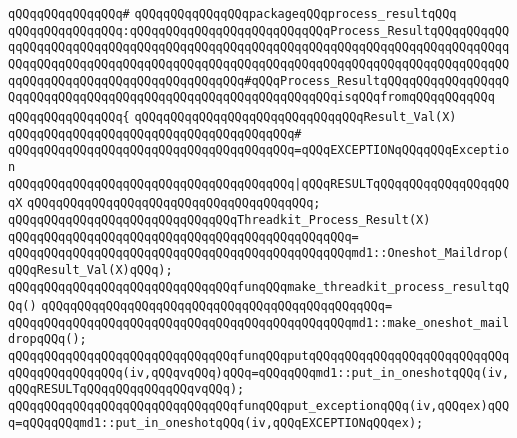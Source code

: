 \verb|qQQqqQQqqQQqqQQq#|\newline
\verb|qQQqqQQqqQQqqQQqpackageqQQqprocess_resultqQQq|\newline
\verb|qQQqqQQqqQQqqQQq:qQQqqQQqqQQqqQQqqQQqqQQqqQQqProcess_ResultqQQqqQQqqQQqqQQqqQQqqQQqqQQqqQQqqQQqqQQqqQQqqQQqqQQqqQQqqQQqqQQqqQQqqQQqqQQqqQQqqQQqqQQqqQQqqQQqqQQqqQQqqQQqqQQqqQQqqQQqqQQqqQQqqQQqqQQqqQQqqQQqqQQqqQQqqQQqqQQqqQQqqQQqqQQqqQQqqQQqqQQq#qQQqProcess_ResultqQQqqQQqqQQqqQQqqQQqqQQqqQQqqQQqqQQqqQQqqQQqqQQqqQQqqQQqqQQqqQQqisqQQqfromqQQqqQQqqQQq|\newline
\verb|qQQqqQQqqQQqqQQq{|\newline
\verb|qQQqqQQqqQQqqQQqqQQqqQQqqQQqqQQqResult_Val(X)|\newline
\verb|qQQqqQQqqQQqqQQqqQQqqQQqqQQqqQQqqQQqqQQq#|\newline
\verb|qQQqqQQqqQQqqQQqqQQqqQQqqQQqqQQqqQQqqQQq=qQQqEXCEPTIONqQQqqQQqException|\newline
\verb|qQQqqQQqqQQqqQQqqQQqqQQqqQQqqQQqqQQqqQQq|\verb#|qQQqRESULTqQQqqQQqqQQqqQQqqQQqX#\newline
\verb|qQQqqQQqqQQqqQQqqQQqqQQqqQQqqQQqqQQqqQQq;|\newline
\newline
\verb|qQQqqQQqqQQqqQQqqQQqqQQqqQQqqQQqThreadkit_Process_Result(X)|\newline
\verb|qQQqqQQqqQQqqQQqqQQqqQQqqQQqqQQqqQQqqQQqqQQqqQQq=|\newline
\verb|qQQqqQQqqQQqqQQqqQQqqQQqqQQqqQQqqQQqqQQqqQQqqQQqmd1::Oneshot_Maildrop(qQQqResult_Val(X)qQQq);|\newline
\newline
\verb|qQQqqQQqqQQqqQQqqQQqqQQqqQQqqQQqfunqQQqmake_threadkit_process_resultqQQq()|\newline
\verb|qQQqqQQqqQQqqQQqqQQqqQQqqQQqqQQqqQQqqQQqqQQqqQQq=|\newline
\verb|qQQqqQQqqQQqqQQqqQQqqQQqqQQqqQQqqQQqqQQqqQQqqQQqmd1::make_oneshot_maildropqQQq();|\newline
\newline
\newline
\verb|qQQqqQQqqQQqqQQqqQQqqQQqqQQqqQQqfunqQQqputqQQqqQQqqQQqqQQqqQQqqQQqqQQqqQQqqQQqqQQqqQQq(iv,qQQqvqQQq)qQQq=qQQqqQQqmd1::put_in_oneshotqQQq(iv,qQQqRESULTqQQqqQQqqQQqqQQqvqQQq);|\newline
\verb|qQQqqQQqqQQqqQQqqQQqqQQqqQQqqQQqfunqQQqput_exceptionqQQq(iv,qQQqex)qQQq=qQQqqQQqmd1::put_in_oneshotqQQq(iv,qQQqEXCEPTIONqQQqex);|\newline
